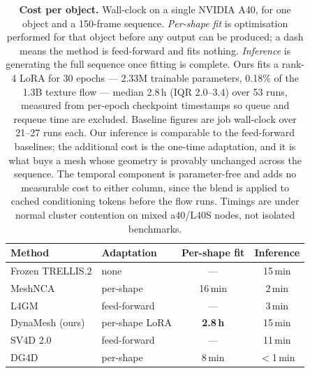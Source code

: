 \begin{table}[t]
\centering
\small
\setlength{\tabcolsep}{6pt}
\begin{tabular}{llcc}
\toprule
Method & Adaptation & Per-shape fit & Inference \\
\midrule
Frozen TRELLIS.2 \cite{trellis2} & none            & ---              & 15\,min \\
MeshNCA \cite{meshnca}           & per-shape       & 16\,min          & 2\,min  \\
L4GM \cite{l4gm}                 & feed-forward    & ---              & 3\,min  \\
DynaMesh (ours)                  & per-shape LoRA  & \textbf{2.8\,h}  & 15\,min \\
\midrule
SV4D 2.0 \cite{sv4d2}            & feed-forward    & ---              & 11\,min \\
DG4D \cite{dg4d}                 & per-shape       & 8\,min           & $<$1\,min \\
\bottomrule
\end{tabular}
\caption{\textbf{Cost per object.} Wall-clock on a single NVIDIA A40, for one object and a
150-frame sequence. \emph{Per-shape fit} is optimisation performed for that object before
any output can be produced; a dash means the method is feed-forward and fits nothing.
\emph{Inference} is generating the full sequence once fitting is complete. Ours fits a
rank-4 LoRA for 30 epochs --- 2.33M trainable parameters, 0.18\% of the 1.3B texture flow
--- median 2.8\,h (IQR 2.0--3.4) over 53 runs, measured from per-epoch checkpoint
timestamps so queue and requeue time are excluded. Baseline figures are job wall-clock
over 21--27 runs each. Our inference is comparable to the feed-forward baselines; the
additional cost is the one-time adaptation, and it is what buys a mesh whose geometry is
provably unchanged across the sequence. The temporal component is parameter-free and adds
no measurable cost to either column, since the blend is applied to cached conditioning
tokens before the flow runs. Timings are under normal cluster contention on mixed
a40/L40S nodes, not isolated benchmarks.}
\label{tab:timing}
\end{table}
